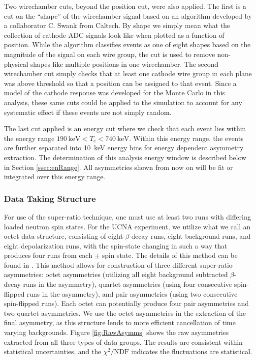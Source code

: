 Two wirechamber cuts, beyond the position cut, were also applied. The first is a cut on the ``shape''
of the wirechamber signal based on an algorithm developed by a collaborator C. Swank from Caltech.
By shape we simply mean what the collection of cathode ADC signals look like when plotted as a
function of position.
While the
algorithm classifies events as one of eight shapes based on the magnitude of
the signal on each wire group, the cut is used to remove non-physical shapes
like multiple positions in one wirechamber. The second wirechamber
cut simply checks that at least one cathode wire group in each plane was above threshold
so that a position can be assigned to that event.
Since a model of the cathode response was
developed for the Monte Carlo in this analysis, these same cuts could be applied to the
simulation to account for any systematic effect if these events are not simply random.

The last cut applied is an energy cut where we check that each event lies within the
energy range $190\mathrm{~keV} < T_e < 740\mathrm{~keV}$.
Within this energy range, the events are further separated into
10~keV energy bins for energy dependent asymmetry extraction. The determination
of this analysis energy window is described below in Section \ref{ssec:enRange}.
All asymmetries shown from now on
will be fit or integrated over this energy range.

\subsubsection{Data Taking Structure}

For use of the super-ratio technique, one must use at least two runs with differing loaded
neutron spin states. For the UCNA experiment, we utilize what we call an octet data structure,
consisting of eight $\beta$-decay runs, eight background runs, and eight depolarization
runs, with the spin-state changing in such a way that produces
four runs from each $\pm$ spin state.
The details of this method can be found in \cite{plaster2012}. This method allows for
construction of three different super-ratio asymmetries: octet asymmetries (utilizing all eight background subtracted
$\beta$-decay runs in the asymmetry), quartet asymmetries (using four consecutive spin-flipped
runs in the asymmetry), and pair asymmetries (using two consecutive spin-flipped runs). Each octet can potentially
produce four pair asymmetries and two quartet asymmetries. We use
the octet asymmetries in the extraction of the final asymmetry, as this structure lends to more
efficient cancellation of time varying backgrounds. Figure \ref{fig:RawAsymms} shows the
raw asymmetries extracted from all three types of data groups. The results are consistent
within statistical uncertainties, and the $\chi^2/\textrm{NDF}$ indicates the fluctuations
are statistical. 

